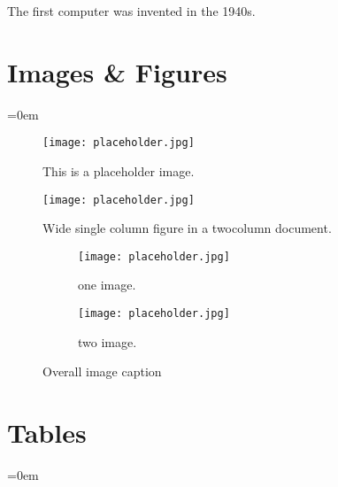 
\tcolorboxnote
{

The first computer was invented in the 1940s.

}



\lipsum[1]


\sectionend

\section{Images \& Figures}
\label{sec:images_&_figures}
\parindent=0em

\lipsum[1]


\begin{figure}[h!]
  \texttt{[image: placeholder.jpg]}
  \caption{This is a placeholder image.}
  \label{fig:placeholder}
\end{figure}


\lipsum[1]


\begin{figure*}[ht]
\centering
\texttt{[image: placeholder.jpg]}
\caption{Wide single column figure in a twocolumn document.}
\end{figure*}


\lipsum


\begin{figure}[h!]
  \centering
  \begin{subfigure}[b]{0.4\linewidth}
    \texttt{[image: placeholder.jpg]}
    \caption{one image.}
  \end{subfigure}
  \begin{subfigure}[b]{0.4\linewidth}
    \texttt{[image: placeholder.jpg]}
    \caption{two image.}
  \end{subfigure}
  \caption{Overall image caption}
\end{figure}


\sectionend

\section{Tables}
\label{sec:tables}
\parindent=0em

